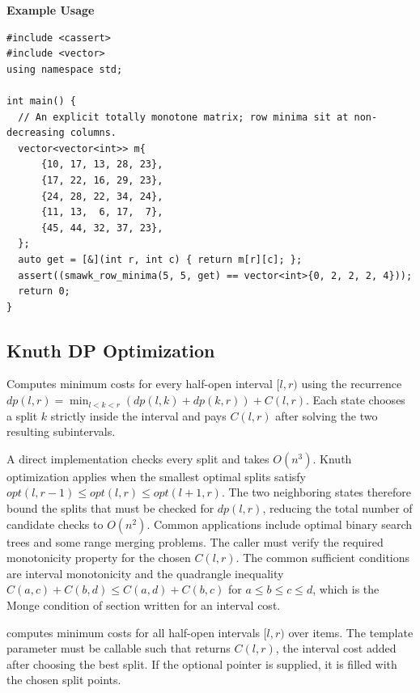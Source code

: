 \textbf{Example Usage}\par
\begin{lstlisting}[style=cpp]
#include <cassert>
#include <vector>
using namespace std;

int main() {
  // An explicit totally monotone matrix; row minima sit at non-decreasing columns.
  vector<vector<int>> m{
      {10, 17, 13, 28, 23},
      {17, 22, 16, 29, 23},
      {24, 28, 22, 34, 24},
      {11, 13,  6, 17,  7},
      {45, 44, 32, 37, 23},
  };
  auto get = [&](int r, int c) { return m[r][c]; };
  assert((smawk_row_minima(5, 5, get) == vector<int>{0, 2, 2, 2, 4}));
  return 0;
}
\end{lstlisting}
\subsection{Knuth DP Optimization}
\label{sec:5.3.3}
Computes minimum costs for every half-open interval $[l, r)$ using the recurrence $dp(l, r) = \min_{l < k < r} (dp(l, k) + dp(k, r)) + C(l, r)$. Each state chooses a split $k$ strictly inside the interval and pays $C(l, r)$ after solving the two resulting subintervals.

A direct implementation checks every split and takes $O(n^{3})$. Knuth optimization applies when the smallest optimal splits satisfy $opt(l, r - 1) \leq opt(l, r) \leq opt(l + 1, r)$. The two neighboring states therefore bound the splits that must be checked for $dp(l, r)$, reducing the total number of candidate checks to $O(n^{2})$. Common applications include optimal binary search trees and some range merging problems. The caller must verify the required monotonicity property for the chosen $C(l, r)$. The common sufficient conditions are interval monotonicity and the quadrangle inequality $C(a, c) + C(b, d) \leq C(a, d) + C(b, c)$ for $a \leq b \leq c \leq d$, which is the Monge condition of section  written for an interval cost.

\begin{compactitem}
  \item {} computes minimum costs for all half-open intervals $[l, r)$ over  items. The template parameter  must be callable such that  returns $C(l, r)$, the interval cost added after choosing the best split. If the optional pointer  is supplied, it is filled with the chosen split points.
\end{compactitem}

